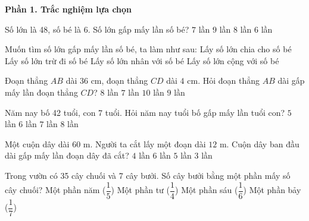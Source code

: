 \textbf{Phần 1. Trắc nghiệm lựa chọn}

\begin{ex} %
Số lớn là 48, số bé là 6. Số lớn gấp mấy lần số bé?
\choice
{$7$ lần}
{$9$ lần}
{\True $8$ lần}
{$6$ lần}
\end{ex}

\begin{ex} %
Muốn tìm số lớn gấp mấy lần số bé, ta làm như sau:
\choice
{\True Lấy số lớn chia cho số bé}
{Lấy số lớn trừ đi số bé}
{Lấy số lớn nhân với số bé}
{Lấy số lớn cộng với số bé}
\end{ex}

\begin{ex} %
Đoạn thẳng $AB$ dài $36\text{ cm}$, đoạn thẳng $CD$ dài $4\text{ cm}$. Hỏi đoạn thẳng $AB$ dài gấp mấy lần đoạn thẳng $CD$?
\choice
{$8$ lần}
{$7$ lần}
{$10$ lần}
{\True $9$ lần}
\end{ex}

\begin{ex} %
Năm nay bố 42 tuổi, con 7 tuổi. Hỏi năm nay tuổi bố gấp mấy lần tuổi con?
\choice
{$5$ lần}
{\True $6$ lần}
{$7$ lần}
{$8$ lần}
\end{ex}

\begin{ex} %
Một cuộn dây dài $60\text{ m}$. Người ta cắt lấy một đoạn dài $12\text{ m}$. Cuộn dây ban đầu dài gấp mấy lần đoạn dây đã cắt?
\choice
{$4$ lần}
{$6$ lần}
{\True $5$ lần}
{$3$ lần}
\end{ex}

\begin{ex} %
Trong vườn có 35 cây chuối và 7 cây bưởi. Số cây bưởi bằng một phần mấy số cây chuối?
\choice
{\True Một phần năm ($\dfrac{1}{5}$)}
{Một phần tư ($\dfrac{1}{4}$)}
{Một phần sáu ($\dfrac{1}{6}$)}
{Một phần bảy ($\dfrac{1}{7}$)}
\end{ex}


